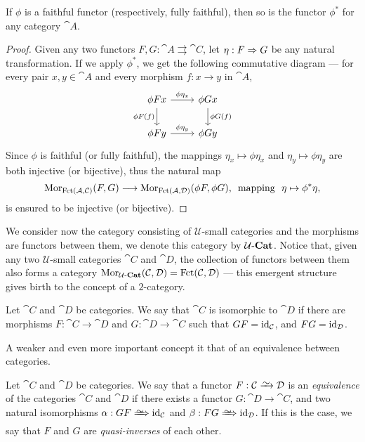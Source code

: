 \begin{lemma}
\label{lem:faithful-pushforward-functor}
If \(\phi\) is a faithful functor (respectively, fully faithful), then so is the
functor \(\phi^{*}\) for any category \(\cat A\).
\end{lemma}

\begin{proof}
Given any two functors \(F, G: \cat A \rightrightarrows \cat C\), let \(\eta: F
\Rightarrow G\) be any natural transformation. If we apply \(\phi^{*}\), we get the
following commutative diagram --- for every pair \(x, y \in \cat A\) and every
morphism \(f: x \to y\) in \(\cat A\),
\[
  \begin{tikzcd}
    \phi F x \ar[r, "\phi \eta_x"] \ar[d, swap, "\phi F(f)"]
    &\phi G x \ar[d, "\phi G(f)"] \\
    \phi F y \ar[r, "\phi \eta_y"]
    &\phi G y
  \end{tikzcd}
\]
Since \(\phi\) is faithful (or fully faithful), the mappings \(\eta_x \mapsto
\phi \eta_x\) and \(\eta_y \mapsto \phi \eta_y\) are both injective (or
bijective), thus the natural map
\[
  \operatorname{Mor}_{\operatorname{Fct}(\mathcal A, \mathcal C)}(F, G) \longrightarrow
  \operatorname{Mor}_{\operatorname{Fct}(\mathcal A, \mathcal D)}(\phi F, \phi G)\text{,}
  \ \text{ mapping }\ \eta \mapsto \phi^{*} \eta,
\]
is ensured to be injective (or bijective).
\end{proof}

We consider now the category consisting of \(\mathcal U\)-small categories and
the morphisms are functors between them, we denote this category by
\({\mathcal{U}\text{-}\textbf{Cat}}\). Notice that, given any two \(\mathcal U\)-small categories \(\cat C\)
and \(\cat D\), the collection of functors between them also forms a category
\(\operatorname{Mor}_{{\mathcal{U}\text{-}\textbf{Cat}}}(\mathcal C, \mathcal D) = \operatorname{Fct}(\mathcal C, \mathcal D)\) --- this emergent
structure gives birth to the concept of a \(2\)-category.

\begin{definition}
\label{def:isomorphism-categories}
Let \(\cat C\) and \(\cat D\) be categories. We say that \(\cat C\) is
isomorphic to \(\cat D\) if there are morphisms \(F: \cat C \to \cat D\) and
\(G: \cat D \to \cat C\) such that \(GF = \operatorname{id}_{\mathcal C}\), and \(FG = \operatorname{id}_{\mathcal
D}\).
\end{definition}

A weaker and even more important concept it that of an equivalence between
categories.

\begin{definition}
\label{def:equivalence-categories}
Let \(\cat C\) and \(\cat D\) be categories. We say that a functor
\(F: \cat C \isoto \cat D\) is an \emph{equivalence} of the categories
\(\cat C\) and \(\cat D\) if there exists a functor \(G: \cat D \to \cat C\), and
two natural isomorphisms \(\alpha: G F \isonat \Id_{\cat C}\) and
\(\beta: F G \isonat \Id_{\cat D}\). If this is the case, we say that \(F\) and
\(G\) are \emph{quasi-inverses} of each other.
\end{definition}

